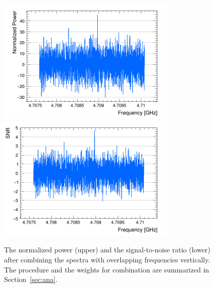 \begin{figure}[htbp]                                                                                                  
    \centering                                                                                                                       
    \includegraphics[width=8.6cm]{figures/Power_CombSpectrum_FaxionRun_AllSteps_Rescan_SG4_W201.png}
    \includegraphics[width=8.6cm]{figures/SNR_CombSpectrum_FaxionRun_AllSteps_Rescan_SG4_W201.png}
    \caption{The normalized power (upper) and the 
signal-to-noise ratio (lower) after combining the spectra with overlapping 
frequencies vertically. The procedure and the weights for combination 
are summarized in Section~\ref{sec:ana}.}                
\label{fig:faxioncombine}                                                                                                            
\end{figure}                       


